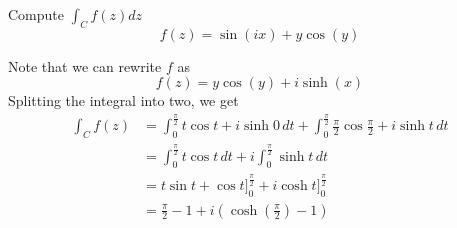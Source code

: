 \documentclass{article}
\begin{document}
    \begin{tcolorbox}[title=Exercise 5]
        Compute $\int_C f(z) dz$
        \begin{equation*}
            f(z) = \sin(ix) + y\cos(y)
        \end{equation*}
    \end{tcolorbox}
    Note that we can rewrite $f$ as
    \begin{equation*}
        f(z) = y\cos(y) + i\sinh(x)
    \end{equation*}
    Splitting the integral into two, we get
    \begin{align*}
        \int_C f(z) &= \int_0^{\frac{\pi}{2}} t\cos{t} + i\sinh 0 \, dt + \int_0^{\frac{\pi}{2}} \frac{\pi}{2}\cos{\frac{\pi}{2}} + i\sinh t \, dt \\
        &= \int_0^{\frac{\pi}{2}} t\cos{t} \,dt + i\int_0^{\frac{\pi}{2}} \sinh t \, dt \\
        &= t\sin{t} + \cos{t} \Bigr]_0^{\frac{\pi}{2}} + i\cosh{t} \Bigr]_0^{\frac{\pi}{2}} \\
        &= \frac{\pi}{2} - 1 + i\left(\cosh\left(\frac{\pi}{2}\right) - 1\right)
    \end{align*}
\end{document}
